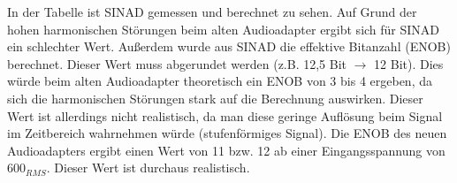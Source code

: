 

In der Tabelle ist SINAD gemessen und berechnet zu sehen. Auf Grund der hohen harmonischen Störungen beim alten Audioadapter ergibt sich für SINAD ein schlechter Wert. Außerdem wurde aus SINAD die effektive Bitanzahl (ENOB) berechnet. Dieser Wert muss abgerundet werden (z.B. 12,5 Bit $\rightarrow$ 12 Bit). Dies würde beim alten Audioadapter theoretisch ein ENOB von 3 bis 4 ergeben, da sich die harmonischen Störungen stark auf die Berechnung auswirken. Dieser Wert ist allerdings nicht realistisch, da man diese geringe Auflösung beim Signal im Zeitbereich wahrnehmen würde (stufenförmiges Signal). Die ENOB des neuen Audioadapters ergibt einen Wert von 11 bzw. 12 ab einer Eingangsspannung von \unit{600}{\milli\volt}$_{RMS}$. Dieser Wert ist durchaus realistisch.

